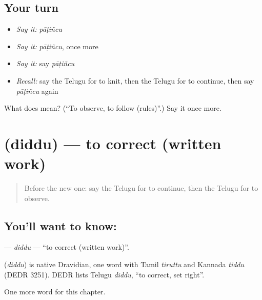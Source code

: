 \subsection*{Your turn}
\begin{itemize}
\raggedright
  \item \emph{Say it:} \emph{pāṭiñcu}
  \item \emph{Say it:} \emph{pāṭiñcu}, once more
  \item \emph{Say it:} say \emph{pāṭiñcu}
  \item \emph{Recall:} say the Telugu for to knit, then the Telugu for to continue, then say \emph{pāṭiñcu} again
\end{itemize}

\begin{tcolorbox}[breakable,colback=teal!4,colframe=teal!35!black,title={Before you move on}]
What does  mean? (\textquotedblleft{}To observe, to follow (rules)\textquotedblright{}.) Say it once more.
\end{tcolorbox}
\section[\texorpdfstring{\te{దిద్దు} (diddu)}{దిద్దు (diddu)}]{ (diddu) — to correct (written work)}

\label{lesson:TE-C166-diddu}



\begin{quote}
Before the new one: say the Telugu for to continue, then the Telugu for to observe.
\end{quote}

\subsection*{You'll want to know: }
\textbf{} — \emph{diddu} — \textquotedblleft{}to correct (written work)\textquotedblright{}.

\begin{cousinweb}
\textbf{} (\emph{diddu}) is native Dravidian, one word with Tamil \emph{tiruttu} and Kannada \emph{tiddu} (DEDR 3251). DEDR lists Telugu \emph{diddu}, \textquotedblleft{}to correct, set right\textquotedblright{}.
\end{cousinweb}

\begin{grammarlens}[title={What you've built}]
One more word for this chapter.
\end{grammarlens}

